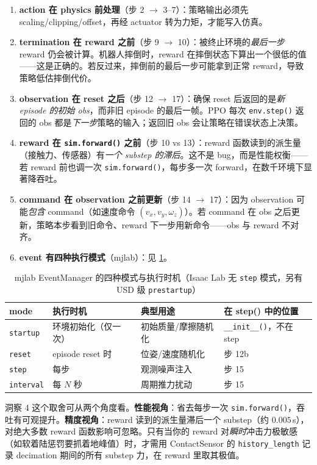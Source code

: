 \begin{enumerate}
  \item \textbf{action 在 physics 前处理}（步 2 $\to$ 3--7）：策略输出必须先 scaling/clipping/offset，再经 actuator 转为力矩，才能写入仿真。
  \item \textbf{termination 在 reward 之前}（步 9 $\to$ 10）：被终止环境的\emph{最后一步} reward 仍会被计算。机器人摔倒时，reward 在摔倒状态下算出一个很低的值——这是正确的。若反过来，摔倒前的最后一步可能拿到正常 reward，导致策略低估摔倒代价。
  \item \textbf{observation 在 reset 之后}（步 12 $\to$ 17）：确保 reset 后返回的是\emph{新 episode 的初始 obs}，而非旧 episode 的最后一帧。PPO 每次 \verb|env.step()| 返回的 obs 都是\emph{下一步}策略的输入；返回旧 obs 会让策略在错误状态上决策。
  \item \textbf{reward 在 \texttt{sim.forward()} 之前}（步 10 vs 13）：reward 函数读到的派生量（接触力、传感器）有\emph{一个 substep 的滞后}。这不是 bug，而是性能权衡——若 reward 前也调一次 \verb|sim.forward()|，每步多一次 forward，在数千环境下显著降吞吐。
  \item \textbf{command 在 observation 之前更新}（步 14 $\to$ 17）：因为 observation 可能\emph{包含} command（如速度命令 $(v_x,v_y,\omega_z)$）。若 command 在 obs 之后更新，策略本步看到旧命令、reward 下一步用新命令——obs 与 reward 不对齐。
  \item \textbf{event 有四种执行模式}（mjlab）：见 \cref{tab:rlmc-mgr-eventmode}。
\end{enumerate}

\begin{table}[ht]
\centering
\caption{mjlab EventManager 的四种模式与执行时机（Isaac Lab 无 \texttt{step} 模式，另有 USD 级 \texttt{prestartup}）}
\label{tab:rlmc-mgr-eventmode}
\small
\begin{tabular}{@{}llll@{}}
\toprule
mode & 执行时机 & 典型用途 & 在 step() 中的位置 \\
\midrule
\verb|startup| & 环境初始化（仅一次） & 初始质量/摩擦随机化 & \verb|__init__()|，不在 step \\
\verb|reset| & episode reset 时 & 位姿/速度随机化 & 步 12b \\
\verb|step| & 每步 & 观测噪声注入 & 步 15 \\
\verb|interval| & 每 $N$ 秒 & 周期推力扰动 & 步 15 \\
\bottomrule
\end{tabular}
\end{table}

\begin{insight}\label{ins:rlmc-mgr-dual}
洞察 4 这个取舍可从两个角度看。\textbf{性能视角}：省去每步一次 \verb|sim.forward()|，吞吐有可观提升。\textbf{精度视角}：reward 读到的派生量滞后一个 substep（约 $0.005$\,s），对绝大多数 reward 函数影响可忽略。只有当你的 reward 对\emph{瞬时}冲击力极敏感（如软着陆惩罚要抓着地峰值）时，才需用 ContactSensor 的 \verb|history_length| 记录 decimation 期间的所有 substep 力，在 reward 里取其极值。
\end{insight}

